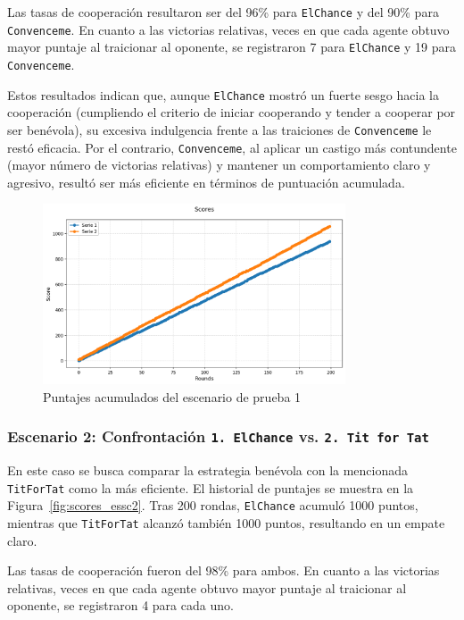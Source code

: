 \documentclass{article}
\begin{document}
Las tasas de cooperación resultaron ser del 96\% para 
\texttt{ElChance} y del 90\% para \texttt{Convenceme}. 
En cuanto a las victorias relativas, veces en que cada agente obtuvo 
mayor puntaje al traicionar al oponente, se registraron 7 para 
\texttt{ElChance} y 19 para \texttt{Convenceme}.  

Estos resultados indican que, aunque \texttt{ElChance} mostró un 
fuerte sesgo hacia la cooperación (cumpliendo el criterio de iniciar 
cooperando y tender a cooperar por ser benévola), su excesiva indulgencia 
frente a las traiciones de \texttt{Convenceme} le restó eficacia. 
Por el contrario, \texttt{Convenceme}, al aplicar un castigo 
más contundente (mayor número de victorias relativas) y mantener 
un comportamiento claro y agresivo, resultó ser más eficiente en 
términos de puntuación acumulada.

\begin{figure}[H]        
  \centering             
  \includegraphics[width=0.8\textwidth]{diagrams/escenario1.png}
  \caption{Puntajes acumulados del escenario de prueba 1}
  \label{fig:scores_essc1}
\end{figure}

\subsubsection{Escenario 2: Confrontación 
  \texttt{1. ElChance} vs. \texttt{2. Tit for Tat}} \label{sec:esc2}

En este caso se busca comparar la estrategia benévola con la mencionada 
\texttt{TitForTat} como la más eficiente. El historial de puntajes se muestra en 
la Figura~\ref{fig:scores_essc2}. Tras 200 rondas, \texttt{ElChance} acumuló 1000 puntos, 
mientras que \texttt{TitForTat} alcanzó también 1000 puntos, resultando en un empate claro.

Las tasas de cooperación fueron del 98\% para ambos. En cuanto a las victorias relativas, 
veces en que cada agente obtuvo mayor puntaje al traicionar al oponente, se registraron 4 para 
cada uno.
\end{document}
